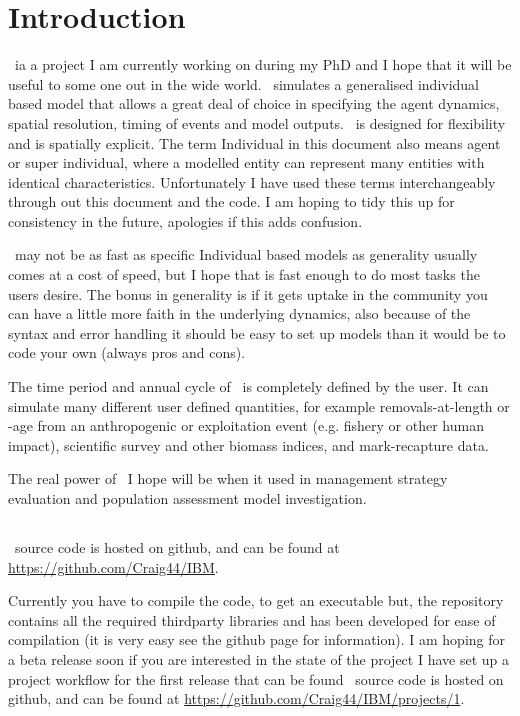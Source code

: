 \section{Introduction\label{sec:Introduction}} 

\IBM\ ia a project I am currently working on during my PhD and I hope that it will be useful to some one out in the wide world. \IBM\ simulates a generalised individual based model that allows a great deal of choice in specifying the agent dynamics, spatial resolution, timing of events and model outputs. \IBM\ is designed for flexibility and is spatially explicit. The term Individual in this document also means agent or super individual, where a modelled entity can represent many entities with identical characteristics. Unfortunately I have used these terms interchangeably through out this document and the code. I am hoping to tidy this up for consistency in the future, apologies if this adds confusion.

\IBM\ may not be as fast as specific Individual based models as generality usually comes at a cost of speed, but I hope that is fast enough to do most tasks the users desire. The bonus in generality is if it gets uptake in the community you can have a little more faith in the underlying dynamics, also because of the syntax and error handling it should be easy to set up models than it would be to code your own (always pros and cons).

The time period and annual cycle of \IBM\ is completely defined by the user. It can simulate many different user defined quantities, for example removals-at-length or -age from an anthropogenic or exploitation event (e.g. fishery or other human impact), scientific survey and other biomass indices, and mark-recapture data.

The real power of \IBM\ I hope will be when it used in management strategy evaluation and population assessment model investigation.

\subsection{}
\IBM\ source code is hosted on github, and can be found at \url{https://github.com/Craig44/IBM}.

Currently you have to compile the code, to get an executable but, the repository contains all the required thirdparty libraries and has been developed for ease of compilation (it is very easy see the github page for information). I am hoping for a beta release soon if you are interested in the state of the project I have set up a project workflow for the first release that can be found \IBM\ source code is hosted on github, and can be found at \url{https://github.com/Craig44/IBM/projects/1}.

